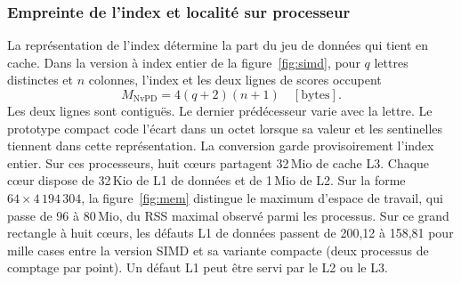 


\subsubsection{Empreinte de l’index et localité sur processeur}
La représentation de l'index détermine la part du jeu de données qui tient en cache. Dans la version à index entier de la figure~\ref{fig:simd}, pour \(q\) lettres distinctes et \(n\) colonnes, l'index et les deux lignes de scores occupent
\[
 M_{\mathrm{NvPD}}=4(q+2)(n+1)\quad [\mathrm{bytes}].
\]
Les deux lignes sont contiguës. Le dernier prédécesseur varie avec la lettre. Le prototype compact code l'écart dans un octet lorsque sa valeur et les sentinelles tiennent dans cette représentation. La conversion garde provisoirement l'index entier. Sur ces processeurs, huit cœurs partagent 32\,Mio de cache L3. Chaque cœur dispose de 32\,Kio de L1 de données et de 1\,Mio de L2.
Sur la forme \(64\times4\,194\,304\), la figure~\ref{fig:mem} distingue le maximum d'espace de travail, qui passe de 96 à 80\,Mio, du RSS maximal observé parmi les processus. Sur ce grand rectangle à huit cœurs, les défauts L1 de données passent de 200,12 à 158,81 pour mille cases entre la version SIMD et sa variante compacte (deux processus de comptage par point). Un défaut L1 peut être servi par le L2 ou le L3.





